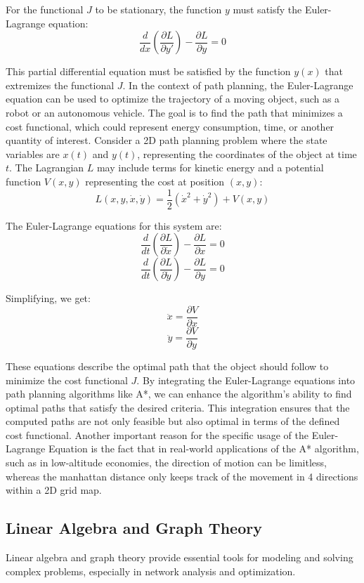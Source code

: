 \documentclass[12pt]{article}
\begin{document}
For the functional \( J \) to be stationary, the function \( y \) must satisfy the Euler-Lagrange equation:
\[
\frac{d}{dx} \left( \frac{\partial L}{\partial y'} \right) - \frac{\partial L}{\partial y} = 0
\]

This partial differential equation must be satisfied by the function \( y(x) \) that extremizes the functional \( J \). In the context of path planning, the Euler-Lagrange equation can be used to optimize the trajectory of a moving object, such as a robot or an autonomous vehicle. The goal is to find the path that minimizes a cost functional, which could represent energy consumption, time, or another quantity of interest. Consider a 2D path planning problem where the state variables are \( x(t) \) and \( y(t) \), representing the coordinates of the object at time \( t \). The Lagrangian \( L \) may include terms for kinetic energy and a potential function \( V(x, y) \) representing the cost at position \((x, y)\):
\[
L(x, y, \dot{x}, \dot{y}) = \frac{1}{2} (\dot{x}^2 + \dot{y}^2) + V(x, y)
\]

The Euler-Lagrange equations for this system are:
\[
\frac{d}{dt} \left( \frac{\partial L}{\partial \dot{x}} \right) - \frac{\partial L}{\partial x} = 0
\]
\[
\frac{d}{dt} \left( \frac{\partial L}{\partial \dot{y}} \right) - \frac{\partial L}{\partial y} = 0
\]

Simplifying, we get:
\[
\ddot{x} = \frac{\partial V}{\partial x}
\]
\[
\ddot{y} = \frac{\partial V}{\partial y}
\]

These equations describe the optimal path that the object should follow to minimize the cost functional \( J \). By integrating the Euler-Lagrange equations into path planning algorithms like A*, we can enhance the algorithm's ability to find optimal paths that satisfy the desired criteria. This integration ensures that the computed paths are not only feasible but also optimal in terms of the defined cost functional. Another important reason for the specific usage of the Euler-Lagrange Equation is the fact that in real-world applications of the A* algorithm, such as in low-altitude economies, the direction of motion can be limitless, whereas the manhattan distance only keeps track of the movement in 4 directions within a 2D grid map.
\newpage
\subsection{Linear Algebra and Graph Theory}
Linear algebra and graph theory provide essential tools for modeling and solving complex problems, especially in network analysis and optimization.
\end{document}
